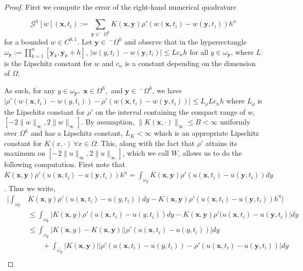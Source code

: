 \documentclass[aps,
preprint,
groupedaddress,
showkeys,
amsmath]{revtex4-2}
\begin{document}
    \begin{proof}
          First we compute the error of the right-hand numerical quadrature
          
        \begin{equation}\label{quadrature}\mathcal{G}^h[w](\mathbf{x},t_i):=\sum_{\mathbf{y}\in ^-\Omega^h}K(\mathbf{x},\mathbf{y})\rho'(w(\mathbf{x},t_i)-w(\mathbf{y},t_i))h^n\end{equation}
        for a bounded $w\in C^{0,1}$. Let $\mathbf{y}\in \,^-\Omega^h$ and observe that in the hyperrectangle $\omega_{\mathbf{y}}:=\prod_{k=1}^n[\mathbf{y}_k,\mathbf{y}_k+h]$, $|w(y,t_i)-w(\mathbf{y},t_i)|\leq Lc_nh$ for all $y\in \omega_{\mathbf{y}}$, where $L$ is the Lipschitz constant for $w$ and $c_n$ is a constant depending on the dimension of $\Omega$.  

        As such, for any $y\in \omega_{\mathbf{y}},$ $\mathbf{x}\in \Omega^{h},$ and $\mathbf{y}\in \,^-\Omega^h$, we have $|\rho'(w(\mathbf{x},t_i)-w(y,t_i))-\rho'(w(\mathbf{x},t_i)-w(\mathbf{y},t_i))|\leq L_\rho Lc_nh$ where $L_\rho$ is the Lipschitz constant for $\rho'$ on the interval containing the compact range of $w$, $[-2\|w\|_\infty,2\|w\|_\infty]$. By assumption,  $\|K(\mathbf{x},\cdot)\|_\infty\leq B<\infty$ uniformly over $\Omega^h$ and has a Lipschitz constant, $L_K<\infty$ which is an appropriate Lipschitz constant for $K(x,\cdot) \, \forall x\in \Omega$.  This, along with the fact that $\rho'$ attains its maximum on $[-2\|u\|_\infty,2\|u\|_\infty]$, which we call $W$,  allows us to do the following computation. First note that $K(\mathbf{x},\mathbf{y})\rho'(u(\mathbf{x},t_i)-u(\mathbf{y},t_i))h^n=\int_{\omega_y}K(\mathbf{x},\mathbf{y})\rho'(u(\mathbf{x},t_i)-u(\mathbf{y},t_i))dy$. Thus we write,
        \begin{equation*}
            \begin{split}
                \bigg|\int_{\omega_\mathbf{y}}&K(\mathbf{x},y)\rho'(u(\mathbf{x},t_i)-u(y,t_i))dy-K(\mathbf{x},\mathbf{y})\rho'(u(\mathbf{x},t_i)-u(\mathbf{y},t_i))h^n\bigg|\\
                &\leq\int_{\omega_\mathbf{y}}\bigg|K(\mathbf{x},y)\rho'(u(\mathbf{x},t_i)-u(y,t_i))dy-K(\mathbf{x},\mathbf{y})\rho'(u(\mathbf{x},t_i)-u(\mathbf{y},t_i)\bigg|dy\\
                &\leq \int_{\omega_\mathbf{y}}|K(\mathbf{x},y)-K(\mathbf{x},\mathbf{y})||\rho'(u(\mathbf{x},t_i)-u(y,t_i))|dy\\
                &\quad \quad +\int_{\omega_{\mathbf{y}}}|K(\mathbf{x},\mathbf{y})||\rho'(u(\mathbf{x},t_i)-u(y,t_i))-\rho'(u(\mathbf{x},t_i)-u(\mathbf{y},t_i))|dy\\

\end{split}
\end{equation*}
\end{proof}
\end{document}
